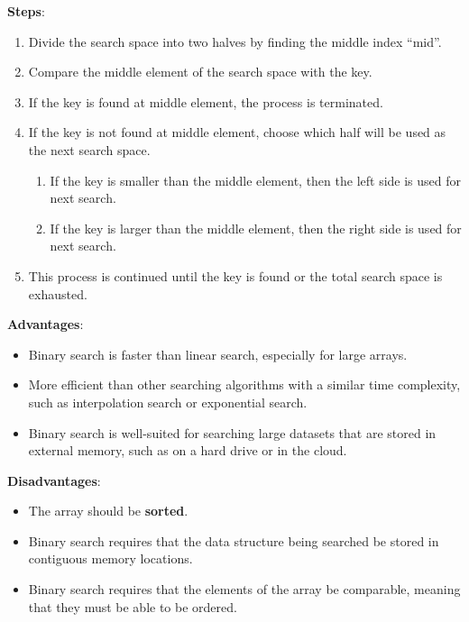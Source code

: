 \textbf{Steps}:
\begin{enumerate}
    \item Divide the search space into two halves by finding the middle index “mid”.
    \item Compare the middle element of the search space with the key.
    \item If the key is found at middle element, the process is terminated.
    \item If the key is not found at middle element, choose which half will be used as the next search space.
    \begin{enumerate}
        \item If the key is smaller than the middle element, then the left side is used for next search.
        \item If the key is larger than the middle element, then the right side is used for next search.
    \end{enumerate}
    \item This process is continued until the key is found or the total search space is exhausted.
\end{enumerate}

\begin{table}[h]
    \begin{minipage}[t]{0.48\linewidth}
        \textbf{Advantages}:
        \begin{itemize}
            \item Binary search is faster than linear search, especially for large arrays.
            \item More efficient than other searching algorithms with a similar time complexity, such as interpolation search or exponential search.
            \item Binary search is well-suited for searching large datasets that are stored in external memory, such as on a hard drive or in the cloud.
        \end{itemize}
    \end{minipage}
    \hfill
    \begin{minipage}[t]{0.48\linewidth}
        \textbf{Disadvantages}:
        \begin{itemize}
            \item The array should be \textbf{sorted}.
            \item Binary search requires that the data structure being searched be stored in contiguous memory locations. 
            \item Binary search requires that the elements of the array be comparable, meaning that they must be able to be ordered.
        \end{itemize}
    \end{minipage}
\end{table}

